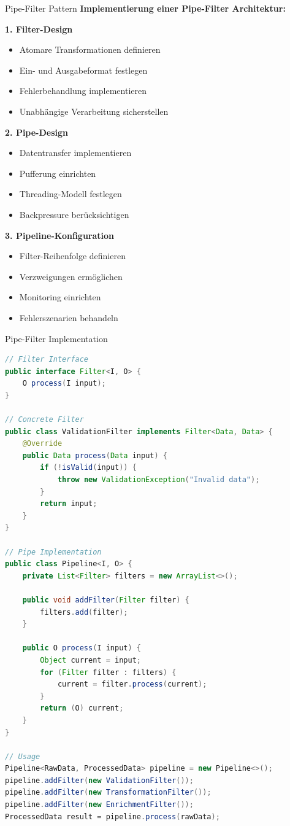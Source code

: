 \begin{KR}{Pipe-Filter Pattern}
\textbf{Implementierung einer Pipe-Filter Architektur:}

\textbf{1. Filter-Design}
\begin{itemize}
    \item Atomare Transformationen definieren
    \item Ein- und Ausgabeformat festlegen
    \item Fehlerbehandlung implementieren
    \item Unabhängige Verarbeitung sicherstellen
\end{itemize}

\textbf{2. Pipe-Design}
\begin{itemize}
    \item Datentransfer implementieren
    \item Pufferung einrichten
    \item Threading-Modell festlegen
    \item Backpressure berücksichtigen
\end{itemize}

\textbf{3. Pipeline-Konfiguration}
\begin{itemize}
    \item Filter-Reihenfolge definieren
    \item Verzweigungen ermöglichen
    \item Monitoring einrichten
    \item Fehlerszenarien behandeln
\end{itemize}
\end{KR}

\begin{example2}{Pipe-Filter Implementation}
\begin{lstlisting}[language=Java, style=basesmol]
// Filter Interface
public interface Filter<I, O> {
    O process(I input);
}

// Concrete Filter
public class ValidationFilter implements Filter<Data, Data> {
    @Override
    public Data process(Data input) {
        if (!isValid(input)) {
            throw new ValidationException("Invalid data");
        }
        return input;
    }
}

// Pipe Implementation
public class Pipeline<I, O> {
    private List<Filter> filters = new ArrayList<>();
    
    public void addFilter(Filter filter) {
        filters.add(filter);
    }
    
    public O process(I input) {
        Object current = input;
        for (Filter filter : filters) {
            current = filter.process(current);
        }
        return (O) current;
    }
}

// Usage
Pipeline<RawData, ProcessedData> pipeline = new Pipeline<>();
pipeline.addFilter(new ValidationFilter());
pipeline.addFilter(new TransformationFilter());
pipeline.addFilter(new EnrichmentFilter());
ProcessedData result = pipeline.process(rawData);
\end{lstlisting}
\end{example2}

